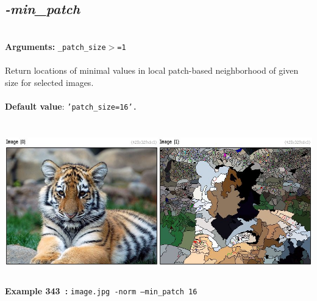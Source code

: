 \documentclass[a4paper,11pt,twoside]{book}
\begin{document}
\subsection{\emph{-min\_patch} }\vspace*{-0.5em}
~\\\textbf{Arguments: } 
{\small \texttt{\_patch\_size$>$=1}}\\~\\
Return locations of minimal values in local patch-based neighborhood of given size for selected images.
~\\~\\\textbf{Default value}: {\small \texttt{'patch\_size=16'.}}
\begin{center}\includegraphics[keepaspectratio=true,height=7cm,width=\textwidth]{img/gmic_def343.jpg}\\
{\footnotesize \textbf{Example 343~:} \texttt{image.jpg -norm --min\_patch 16}}
\end{center}
\end{document}
